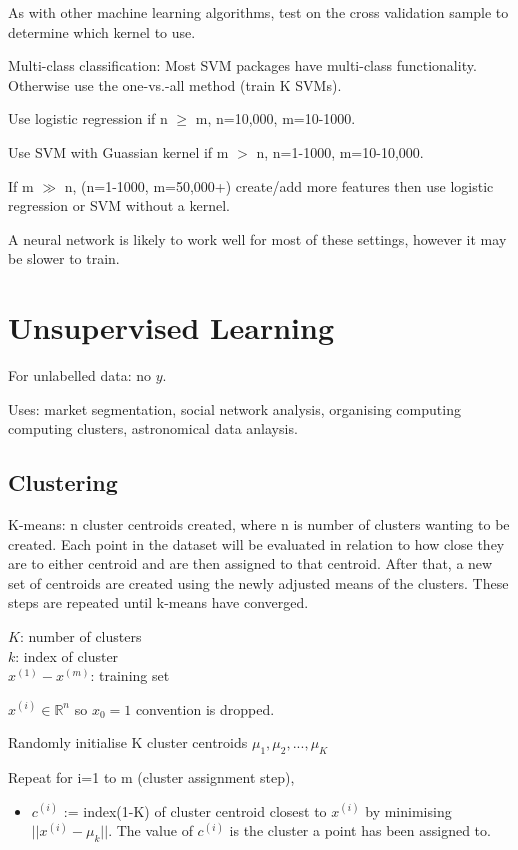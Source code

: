 \documentclass[12pt] {article}
\begin{document}
{    As with other machine learning algorithms, test on the cross validation
    sample to determine which kernel to use. 

    Multi-class classification: Most SVM packages have multi-class 
    functionality. Otherwise use the one-vs.-all method (train K SVMs).

    Use logistic regression if n $\geq$ m, n=10,000, m=10-1000.

    Use SVM with Guassian kernel if m $>$ n, n=1-1000, m=10-10,000.

    If m $\gg$ n, (n=1-1000, m=50,000+)  create/add more features then use 
    logistic regression or SVM without a kernel.

    A neural network is likely to work well for most of these settings, 
    however it may be slower to train.

  \newpage

\section{Unsupervised Learning}

  For unlabelled data: no $y$.

  Uses: market segmentation, social network analysis, organising computing
  computing clusters, astronomical data anlaysis. 

  \subsection{Clustering}
  
    K-means: n cluster centroids created, where n is number of clusters wanting
    to be created. Each point in the dataset will be evaluated in relation to 
    how close they are to either centroid and are then assigned to that
    centroid. After that, a new set of centroids are created using the newly 
    adjusted means of the clusters. These steps are repeated until k-means
    have converged.
    
    $K$: number of clusters\\
    $k$: index of cluster\\
    $x^{(1)}-x^{(m)}$: training set

    $x^{(i)} \in\mathbb{R}^n$ so $x_0 = 1$ convention is dropped.

    Randomly initialise K cluster centroids $\mu_1,\mu_2,...,\mu_K$

    Repeat for i=1 to m (cluster assignment step), 
    \begin{itemize}
    \vspace{-1em}
      \item $c^{(i)}$ := index(1-K) of cluster centroid closest to $x^{(i)}$ by
            minimising $||x^{(i)} - \mu_k||$. The value of $c^{(i)}$ is the 
            cluster a point has been assigned to.
    \end{itemize}

}
\end{document}
